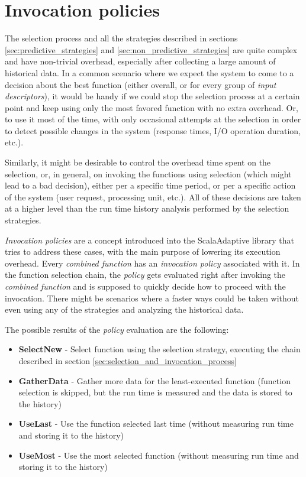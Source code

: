 \section{Invocation policies}

The selection process and all the strategies described in sections \ref{sec:predictive_strategies} and \ref{sec:non_predictive_strategies} are quite complex and have non-trivial overhead, especially after collecting a large amount of historical data. In a common scenario where we expect the system to come to a decision about the best function (either overall, or for every group of \textit{input descriptors}), it would be handy if we could stop the selection process at a certain point and keep using only the most favored function with no extra overhead. Or, to use it most of the time, with only occasional attempts at the selection in order to detect possible changes in the system (response times, I/O operation duration, etc.).

Similarly, it might be desirable to control the overhead time spent on the selection, or, in general, on invoking the functions using selection (which might lead to a bad decision), either per a specific time period, or per a specific action of the system (user request, processing unit, etc.). All of these decisions are taken at a higher level than the run time history analysis performed by the selection strategies.  

\textit{Invocation policies} are a concept introduced into the ScalaAdaptive library that tries to address these cases, with the main purpose of lowering its execution overhead. Every \textit{combined function} has an \textit{invocation policy} associated with it. In the function selection chain, the \textit{policy} gets evaluated right after invoking the \textit{combined function} and is supposed to quickly decide how to proceed with the invocation. There might be scenarios where a faster ways could be taken without even using any of the strategies and analyzing the historical data.

The possible results of the \textit{policy} evaluation are the following:

\begin{itemize}
	\item \textbf{SelectNew} - Select function using the selection strategy, executing the chain described in section \ref{sec:selection_and_invocation_process}
	\item \textbf{GatherData} - Gather more data for the least-executed function (function selection is skipped, but the run time is measured and the data is stored to the history)
	\item \textbf{UseLast} - Use the function selected last time (without measuring run time and storing it to the history)
	\item \textbf{UseMost} - Use the most selected function (without measuring run time and storing it to the history)
\end{itemize}

